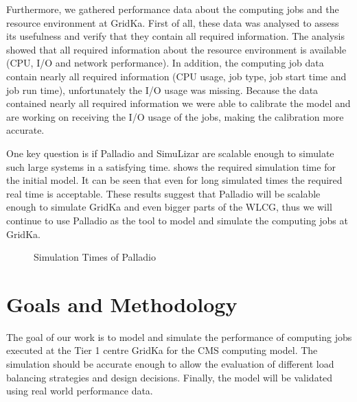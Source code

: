 Furthermore, we gathered performance data about the computing jobs and the resource environment at GridKa.
First of all, these data was analysed to assess its usefulness and verify that they contain all required information. The analysis showed that all required information about the resource environment is available (CPU, I/O and network performance). In addition, the computing job data contain nearly all required information (CPU usage, job type, job start time and job run time), unfortunately the I/O usage was missing.
Because the data contained nearly all required information we were able to calibrate the model and are working on receiving the I/O usage of the jobs, making the calibration more accurate.

One key question is if Palladio and SimuLizar are scalable enough to simulate such large systems in a satisfying time.  shows the required simulation time for the initial model. It can be seen that even for long simulated times the required real time is acceptable.
These results suggest that Palladio will be scalable enough to simulate GridKa and even bigger parts of the WLCG, thus we will continue to use Palladio as the tool to model and simulate the computing jobs at GridKa. 

\begin{figure}[h]
	\begin{center}
		\caption{Simulation Times of Palladio}
		\label{scal}
	\end{center}
\end{figure}


\chapter{Goals and Methodology}
The goal of our work is to model and simulate the performance of computing jobs executed at the Tier 1 centre GridKa for the CMS computing model. The simulation should be accurate enough to allow the evaluation of different load balancing strategies and design decisions. Finally, the model will be validated using real world performance data. 

